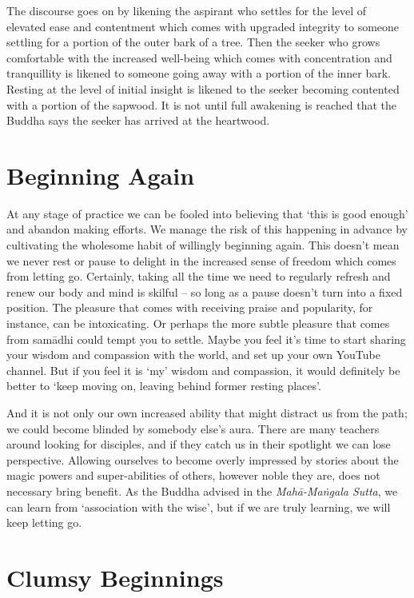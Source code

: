 The discourse goes on by likening the aspirant who settles for the level
of elevated ease and contentment which comes with upgraded integrity to
someone settling for a portion of the outer bark of a tree. Then the
seeker who grows comfortable with the increased well-being which comes
with concentration and tranquillity is likened to someone going away
with a portion of the inner bark. Resting at the level of initial
insight is likened to the seeker becoming contented with a portion of
the sapwood. It is not until full awakening is reached that the Buddha
says the seeker has arrived at the heartwood.

\section{Beginning Again}

At any stage of practice we can be fooled into believing that ‘this is
good enough’ and abandon making efforts. We manage the risk of this
happening in advance by cultivating the wholesome habit of willingly
beginning again. This doesn’t mean we never rest or pause to delight in
the increased sense of freedom which comes from letting go. Certainly,
taking all the time we need to regularly refresh and renew our body and
mind is skilful – so long as a pause doesn’t turn into a fixed position.
The pleasure that comes with receiving praise and popularity, for
instance, can be intoxicating. Or perhaps the more subtle pleasure that
comes from samādhi could tempt you to settle. Maybe you feel it’s time
to start sharing your wisdom and compassion with the world, and set up
your own YouTube channel. But if you feel it is ‘my’ wisdom and
compassion, it would definitely be better to ‘keep moving on, leaving
behind former resting places’.

And it is not only our own increased ability that might distract us from
the path; we could become blinded by somebody else’s aura. There are
many teachers around looking for disciples, and if they catch us in
their spotlight we can lose perspective. Allowing ourselves to become
overly impressed by stories about the magic powers and super-abilities
of others, however noble they are, does not necessary bring benefit. As
the Buddha advised in
the \emph{Mahā-Maṅgala Sutta}\cite{mahamangala-sutta},
we can learn from ‘association with the wise’, but if we are truly learning, we will keep
letting go.

\section{Clumsy Beginnings}

